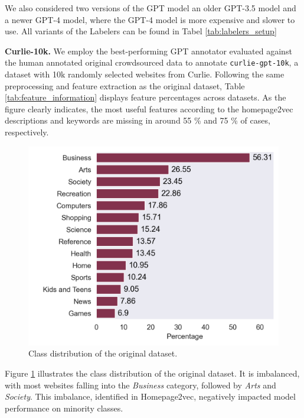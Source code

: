 We also considered two versions of the GPT model an older GPT-3.5 model and a newer GPT-4 model, where the GPT-4 model is more expensive and slower to use.
All variants of the Labelers can be found in Tabel \ref{tab:labelers_setup}


\textbf{Curlie-10k.} 
We employ the best-performing GPT annotator evaluated against the human annotated original crowdsourced data to annotate \texttt{curlie-gpt-10k}, a dataset with 10k randomly selected websites from Curlie. 
Following the same preprocessing and feature extraction as the original dataset, Table \ref{tab:feature_information} displays feature percentages across datasets. 
As the figure clearly indicates, the most useful features according to the homepage2vec \cite{homepage2vec} descriptions and keywords are missing in around 55 \% and 75 \% of cases, respectively. 

\begin{figure}[!ht]
    \centering
    \includegraphics[width=1\columnwidth]{figures/category_distribution.png}
    \caption{Class distribution of the original dataset.}
    \label{fig:class_distribution}
\end{figure}

Figure \ref{fig:class_distribution} illustrates the class distribution of the original dataset. It is imbalanced, with most websites falling into the \textit{Business} category, followed by \textit{Arts} and \textit{Society}. This imbalance, identified in Homepage2vec, negatively impacted model performance on minority classes.


